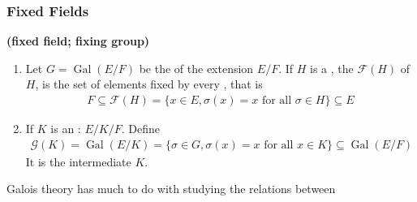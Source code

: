 \documentclass{article}
\newcommand{\bfs}[1]{\textbf{({#1}) }}
\begin{document}
\subsubsection{Fixed Fields}
\begin{defa}\bfs{fixed field; fixing group}
\begin{enumerate}
    \item Let $G=\operatorname{Gal}(E / F)$ be the  of the extension $E / F$. If $H$ is a , the  $\mathcal{F}(H)$ of $H$, is the set of elements fixed by every , that is
\begin{align*}
F\subseteq \mathcal{F}(H)=\{x \in E, \sigma(x)=x \text { for all } \sigma \in H\}\subseteq E
\end{align*}
\item If $K$ is an : $E/K/F$. Define
\begin{align*}
\mathcal{G}(K)=\operatorname{Gal}(E / K)=\{\sigma \in G, \sigma(x)=x \text { for all } x \in K\}\subseteq \operatorname{Gal}(E / F)
\end{align*}
It is the  intermediate $K$.
\end{enumerate}
\end{defa} 

Galois theory has much to do with studying the relations between 
\end{document}
